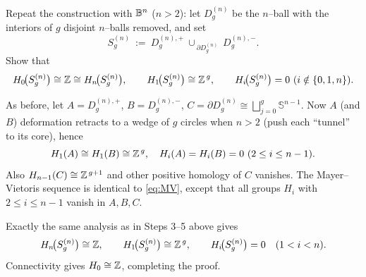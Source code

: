 
\begin{exercise}\label{ex:higherD}
Repeat the construction with $\mathbb{B}^n$ ($n>2$): let $D_g^{(n)}$ be the $n$–ball
with the interiors of $g$ disjoint $n$–balls removed, and set
\[
S_g^{(n)}\ :=\ D_g^{(n),+}\ \cup_{\ \partial D_g^{(n)}}\ D_g^{(n),-}.
\]
Show that
\[
H_0\!\big(S_g^{(n)}\big)\cong \mathbb{Z} \cong H_n\!\big(S_g^{(n)}\big),\qquad
H_1\!\big(S_g^{(n)}\big)\cong \mathbb{Z}^{\,g},\qquad
H_i\!\big(S_g^{(n)}\big)=0 \ (i\notin\{0,1,n\}).
\]
\end{exercise}

\begin{solution}
As before, let $A=D_g^{(n),+}$, $B=D_g^{(n),-}$, $C=\partial D_g^{(n)}\cong
\bigsqcup_{j=0}^g \mathbb{S}^{n-1}$. Now $A$ (and $B$) deformation retracts to a wedge
of $g$ circles when $n>2$ (push each ``tunnel'' to its core), hence
\[
H_1(A)\cong H_1(B)\cong \mathbb{Z}^{\,g},\quad
H_i(A)=H_i(B)=0\ (2\le i\le n-1).
\]
Also $H_{n-1}(C)\cong \mathbb{Z}^{\,g+1}$ and other positive homology of $C$ vanishes.
The Mayer--Vietoris sequence is identical to \eqref{eq:MV}, except that all groups
$H_i$ with $2\le i\le n-1$ vanish in $A,B,C$.

Exactly the same analysis as in Steps 3–5 above gives
\[
H_n\!\big(S_g^{(n)}\big)\cong \mathbb{Z},\qquad
H_1\!\big(S_g^{(n)}\big)\cong \mathbb{Z}^{\,g},\qquad
H_i\!\big(S_g^{(n)}\big)=0\quad(1<i<n).
\]
Connectivity gives $H_0\cong \mathbb{Z}$, completing the proof.
\end{solution}
